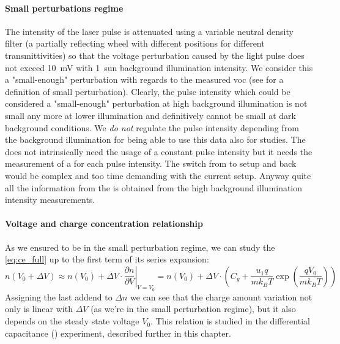 	\paragraph{Small perturbations regime} The intensity of the laser pulse is attenuated using a variable neutral density filter (a partially reflecting wheel with different positions for different transmittivities) so that the voltage perturbation caused by the light pulse does not exceed \SI{10}{\mV} with 1~sun background illumination intensity.
	We consider this a "small-enough" perturbation with regards to the measured \gls{voc} (see  for a definition of small perturbation).
	Clearly, the pulse intensity which could be considered a "small-enough" perturbation at high background illumination is not small any more at lower illumination and definitively cannot be small at dark background conditions.
	We \emph{do not} regulate the pulse intensity depending from the background illumination for being able to use this data also for  studies. The  does not intrinsically need the usage of a constant pulse intensity but it needs the measurement of a  for each pulse intensity. The switch from  to  setup and back would be complex and too time demanding with the current setup. Anyway quite all the information from the  is obtained from the high background illumination intensity measurements.
	
	\paragraph{Voltage and charge concentration relationship} As we ensured to be in the small perturbation regime, we can study the \cref{eq:ce_full} up to the first term of its series expansion:
	\begin{dmath*}
	n(V_0 + \Delta V) \approx n(V_0) + \Delta V \cdot \left.\frac{\partial n}{\partial V}\right\rvert_{V=V_0} = n(V_0) + \Delta V \cdot \left(C_g + \frac{u_1q}{mk_BT}\exp\left(\frac{qV_0}{mk_BT}\right)\right)
	\end{dmath*}
	Assigning the last addend to $\Delta n$ we can see that the charge amount variation not only is linear with $\Delta V$ (as we're in the small perturbation regime), but it also depends on the steady state voltage $V_0$. This relation is studied in the differential capacitance () experiment, described further in this chapter. 
	
